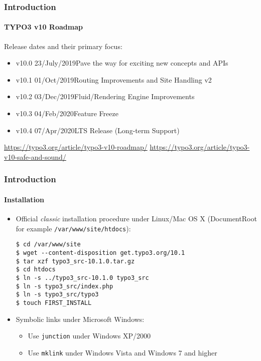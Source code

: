 
\begin{frame}[fragile]
	\frametitle{Introduction}
	\framesubtitle{TYPO3 v10 Roadmap}

	Release dates and their primary focus:

	\begin{itemize}

		\item v10.0 \tabto{1.1cm}23/July/2019\tabto{3.4cm}Pave the way for exciting new concepts and APIs
		\item
			\begingroup
				\color{typo3orange}
				v10.1 \tabto{1.1cm}01/Oct/2019\tabto{3.4cm}Routing Improvements and Site Handling v2
			\endgroup
		\item v10.2 \tabto{1.1cm}03/Dec/2019\tabto{3.4cm}Fluid/Rendering Engine Improvements
		\item v10.3 \tabto{1.1cm}04/Feb/2020\tabto{3.4cm}Feature Freeze
		\item v10.4 \tabto{1.1cm}07/Apr/2020\tabto{3.4cm}LTS Release (Long-term Support)

	\end{itemize}

	\smaller
		\url{https://typo3.org/article/typo3-v10-roadmap/}\newline
		\url{https://typo3.org/article/typo3-v10-safe-and-sound/}
	\normalsize

\end{frame}


\begin{frame}[fragile]
	\frametitle{Introduction}
	\framesubtitle{Installation}

	\begin{itemize}
		\item Official \textit{classic} installation procedure under Linux/Mac OS X\newline
			(DocumentRoot for example \texttt{/var/www/site/htdocs}):
		\begin{lstlisting}
$ cd /var/www/site
$ wget --content-disposition get.typo3.org/10.1
$ tar xzf typo3_src-10.1.0.tar.gz
$ cd htdocs
$ ln -s ../typo3_src-10.1.0 typo3_src
$ ln -s typo3_src/index.php
$ ln -s typo3_src/typo3
$ touch FIRST_INSTALL
		\end{lstlisting}

		\item Symbolic links under Microsoft Windows:

			\begin{itemize}
				\item Use \texttt{junction} under Windows XP/2000
				\item Use \texttt{mklink} under Windows Vista and Windows 7 and higher
			\end{itemize}

	\end{itemize}
\end{frame}

